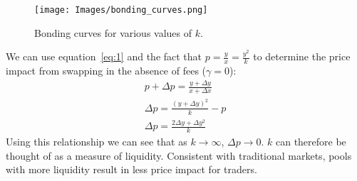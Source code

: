 \documentclass[11pt]{article}
\begin{document}
\begin{figure}[H]
    \centering
    \texttt{[image: Images/bonding\_curves.png]}
    \caption{Bonding curves for various values of $k$.}
    \label{fig:bonding_curves}
\end{figure}


\noindent We can use equation~\eqref{eq:1} and the fact that $p = \frac{y}{x} = \frac{y^2}{k}$ to determine the price impact from swapping in the absence of fees ($\gamma = 0$):
\begin{gather*}
    p + \Delta p = \frac{y + \Delta y}{x + \Delta x} \\
    \Delta p = \frac{(y + \Delta y)^2}{k} - p \\
    \Delta p = \frac{2 \Delta y + \Delta y^2}{k}
\end{gather*}
Using this relationship we can see that as $k \rightarrow \infty$, $\Delta p \rightarrow 0$. $k$ can therefore be thought of as a measure of liquidity. Consistent with traditional markets, pools with more liquidity result in less price impact for traders.
\end{document}
